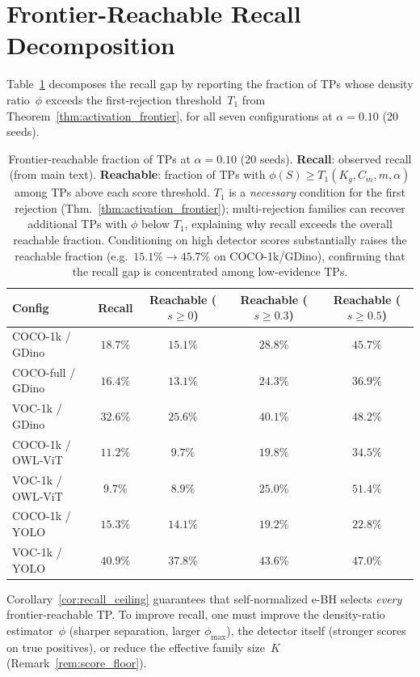 \documentclass{article}
\theoremstyle{remark}
\newcommand{\1}{\mathbf{1}}
\begin{document}
\section{Frontier-Reachable Recall Decomposition}
\label{app:recall_ceiling}

Table~\ref{tab:recall_ceiling} decomposes the recall gap by reporting
the fraction of TPs whose density ratio~$\phi$ exceeds the first-rejection
threshold~$T_1$ from Theorem~\ref{thm:activation_frontier}, for all
seven configurations at $\alpha=0.10$ (20 seeds).

\begin{table}[h]
\centering
\small
\begin{tabular*}{\linewidth}{@{\extracolsep{\fill}}lcccc@{}}
\toprule
Config & Recall
  & Reachable ($s\!\ge\!0$)
  & Reachable ($s\!\ge\!0.3$)
  & Reachable ($s\!\ge\!0.5$) \\
\midrule
COCO-1k / GDino   & $18.7\%$ & $15.1\%$ & $28.8\%$ & $45.7\%$ \\
COCO-full / GDino  & $16.4\%$ & $13.1\%$ & $24.3\%$ & $36.9\%$ \\
VOC-1k / GDino    & $32.6\%$ & $25.6\%$ & $40.1\%$ & $48.2\%$ \\
COCO-1k / OWL-ViT & $11.2\%$ & $ 9.7\%$ & $19.8\%$ & $34.5\%$ \\
VOC-1k / OWL-ViT  & $ 9.7\%$ & $ 8.9\%$ & $25.0\%$ & $51.4\%$ \\
COCO-1k / YOLO    & $15.3\%$ & $14.1\%$ & $19.2\%$ & $22.8\%$ \\
VOC-1k / YOLO     & $40.9\%$ & $37.8\%$ & $43.6\%$ & $47.0\%$ \\
\bottomrule
\end{tabular*}
\caption{Frontier-reachable fraction of TPs at $\alpha=0.10$ (20
seeds). \textbf{Recall}: observed recall (from main text).
\textbf{Reachable}: fraction of TPs with $\phi(S)\ge T_1(K_g,C_m,m,\alpha)$
among TPs above each score threshold.
$T_1$ is a \emph{necessary} condition for the first rejection
(Thm.~\ref{thm:activation_frontier}); multi-rejection families can
recover additional TPs with $\phi$ below $T_1$, explaining why recall
exceeds the overall reachable fraction.
Conditioning on high detector scores substantially raises the reachable
fraction (e.g.\ $15.1\% \to 45.7\%$ on COCO-1k/GDino), confirming
that the recall gap is concentrated among low-evidence TPs.}
\label{tab:recall_ceiling}
\end{table}

Corollary~\ref{cor:recall_ceiling} guarantees that self-normalized e-BH
selects \emph{every} frontier-reachable TP. To improve recall, one
must improve the density-ratio estimator~$\phi$ (sharper separation,
larger $\phi_{\max}$), the detector itself (stronger scores on true
positives), or reduce the effective family size~$K$
(Remark~\ref{rem:score_floor}).
\end{document}
